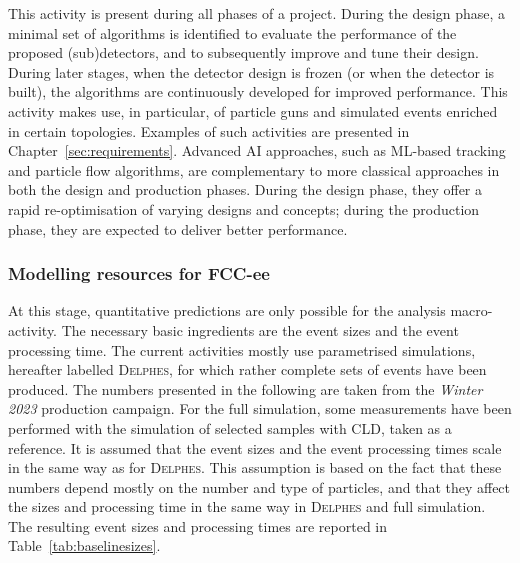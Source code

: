 This activity is present during all phases of a project. 
During the design phase, a minimal set of algorithms is identified to evaluate the performance of the proposed (sub)detectors, and to subsequently improve and tune their design. 
During later stages, when the detector design is frozen (or when the detector is built), the algorithms are continuously developed for improved performance. 
This activity makes use, in particular, of particle guns and simulated events enriched in certain topologies. 
Examples of such activities are presented in Chapter~\ref{sec:requirements}.
Advanced AI approaches, such as ML-based tracking and particle flow algorithms, are complementary to more classical approaches in both the design and production phases. During the design phase, they offer a rapid re-optimisation of varying designs and concepts; during the production phase, they are expected to deliver better performance.

\subsubsection{Modelling resources for FCC-ee}

At this stage, quantitative predictions are only possible for the analysis macro-activity. The necessary basic ingredients are the event sizes and the event processing time. The current activities mostly use parametrised simulations, hereafter labelled \textsc{Delphes}, 
for which rather complete sets of events have been produced. 
The numbers presented in the following are taken from the \emph{Winter 2023} production campaign. 
For the full simulation, some measurements have been performed with the simulation of selected samples with CLD, taken as a reference. 
It is assumed that the event sizes and the event processing times scale in the same way as for \textsc{Delphes}. 
This assumption is based on the fact that these numbers depend mostly on the number and type of particles, 
and that they affect the sizes and processing time in the same way in \textsc{Delphes} and full simulation.
The resulting event sizes and processing times are reported in Table~\ref{tab:baselinesizes}. 

